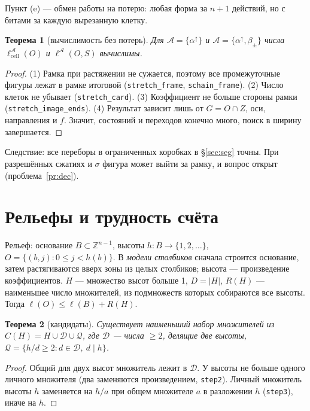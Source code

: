 \documentclass[11pt,a4paper]{article}
\theoremstyle{plain}
\newtheorem{theorem}{Теорема}[section]
\theoremstyle{definition}
\theoremstyle{remark}
\newcommand{\Z}{\mathbb{Z}}
\newcommand{\lc}{\ell_{\mathrm{cell}}}
\newcommand{\lean}[1]{\texttt{#1}}
\begin{document}
Пункт (e) — обмен работы на потерю: любая форма за $n+1$ действий, но с битами за каждую вырезанную клетку.

\begin{theorem}[вычислимость без потерь]\label{thm:dec}
Для $\mathcal A=\{\alpha^\uparrow\}$ и $\mathcal A=\{\alpha^\uparrow,\beta_\pm\}$ числа $\lc^{\mathcal A}(O)$ и $\ell^{\mathcal A}(O,S)$ вычислимы.
\end{theorem}
\begin{proof}
(1) Рамка при растяжении не сужается, поэтому все промежуточные фигуры лежат в рамке итоговой (\lean{stretch\_frame}, \lean{schain\_frame}). (2) Число клеток не убывает (\lean{stretch\_card}). (3) Коэффициент не больше стороны рамки (\lean{stretch\_image\_ends}). (4) Результат зависит лишь от $G=O\cap Z$, оси, направления и $f$. Значит, состояний и переходов конечно много, поиск в ширину завершается.
\end{proof}

Следствие: все переборы в ограниченных коробках в §\ref{sec:seg} точны. При разрешённых сжатиях и $\sigma$ фигура может выйти за рамку, и вопрос открыт (проблема~\ref{pr:dec}).

\section{Рельефы и трудность счёта}\label{sec:reliefs}

Рельеф: основание $B\subset\Z^{n-1}$, высоты $h\colon B\to\{1,2,\dots\}$, $O=\{(b,j):0\le j<h(b)\}$. В \emph{модели столбиков} сначала строится основание, затем растягиваются вверх зоны из целых столбиков; высота — произведение коэффициентов. $H$ — множество высот больше 1, $D=|H|$, $R(H)$ — наименьшее число множителей, из подмножеств которых собираются все высоты. Тогда $\ell(O)\le\ell(B)+R(H)$.

\begin{theorem}[кандидаты]\label{thm:cand}
Существует наименьший набор множителей из $C(H)=H\cup\mathcal D\cup\mathcal Q$, где $\mathcal D$ — числа $\ge2$, делящие две высоты, $\mathcal Q=\{h/d\ge2: d\in\mathcal D,\ d\mid h\}$.
\end{theorem}
\begin{proof}
Общий для двух высот множитель лежит в $\mathcal D$. У высоты не больше одного личного множителя (два заменяются произведением, \lean{step2}). Личный множитель высоты $h$ заменяется на $h/a$ при общем множителе $a$ в разложении $h$ (\lean{step3}), иначе на $h$.
\end{proof}
\end{document}

